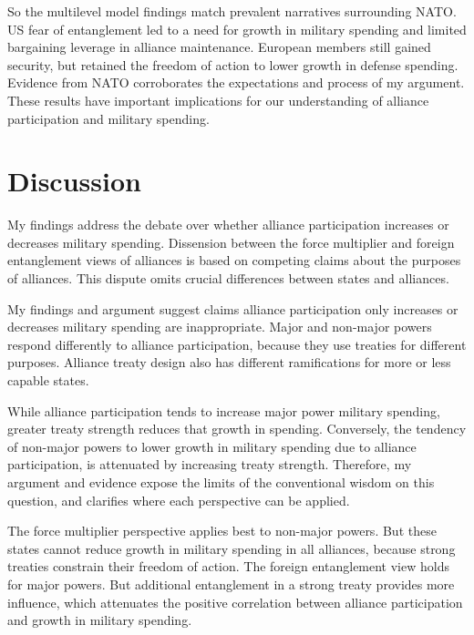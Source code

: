 \documentclass[12pt]{article}
\begin{document}
So the multilevel model findings match prevalent narratives surrounding NATO.
US fear of entanglement led to a need for growth in military spending and limited bargaining leverage in alliance maintenance. 
European members still gained security, but retained the freedom of action to lower growth in defense spending.   
Evidence from NATO corroborates the expectations and process of my argument. 
These results have important implications for our understanding of alliance participation and military spending. 


\section{Discussion}


My findings address the debate over whether alliance participation increases or decreases military spending. 
Dissension between the force multiplier and foreign entanglement views of alliances is based on competing claims about the purposes of alliances. 
This dispute omits crucial differences between states and alliances. 


My findings and argument suggest claims alliance participation only increases or decreases military spending are inappropriate. 
Major and non-major powers respond differently to alliance participation, because they use treaties for different purposes. 
Alliance treaty design also has different ramifications for more or less capable states. 


While alliance participation tends to increase major power military spending, greater treaty strength reduces that growth in spending. 
Conversely, the tendency of non-major powers to lower growth in military spending due to alliance participation, is attenuated by increasing treaty strength. 
Therefore, my argument and evidence expose the limits of the conventional wisdom on this question, and clarifies where each perspective can be applied. 


The force multiplier perspective applies best to non-major powers. 
But these states cannot reduce growth in military spending in all alliances, because strong treaties constrain their freedom of action.
The foreign entanglement view holds for major powers. 
But additional entanglement in a strong treaty provides more influence, which attenuates the positive correlation between alliance participation and growth in military spending. 
\end{document}
